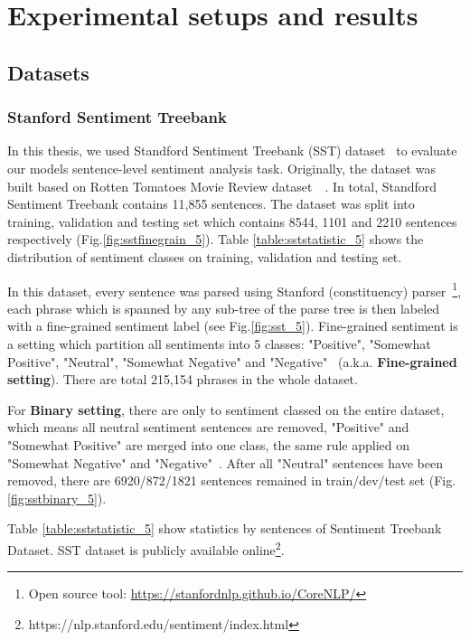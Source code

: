 \hypertarget{chap:result}{\chapter{Experimental setups and results}}\label{result-discuss}
\section{Datasets}
\subsection{Stanford Sentiment Treebank}
In this thesis, we used Standford Sentiment Treebank (SST) dataset~\cite{socher2013recursive} to evaluate our models sentence-level sentiment analysis task.
Originally, the dataset was built based on Rotten Tomatoes Movie Review dataset~\cite{Rotten-Tomato}~\cite{socher2013recursive}.
In total, Standford Sentiment Treebank contains 11,855 sentences.
The dataset was split into training, validation and testing set which contains 8544, 1101 and 2210 sentences respectively (Fig.\ref{fig:sstfinegrain_5}).
Table \ref{table:sststatistic_5} shows the distribution of sentiment classes on training, validation and testing set.

In this dataset, every sentence was parsed using Stanford (constituency) parser~\cite{socher2013recursive}\footnote{Open source tool: \url{https://stanfordnlp.github.io/CoreNLP/}}, each phrase which is spanned by any sub-tree of the parse tree is then labeled with  a fine-grained sentiment label (see Fig.\ref{fig:sst_5}).
Fine-grained sentiment is a setting which partition all sentiments into 5 classes: "Positive", "Somewhat Positive", "Neutral", "Somewhat Negative" and "Negative"~\cite{socher2013recursive} (a.k.a. \textbf{Fine-grained setting}).
There are total 215,154 phrases in the whole dataset.

For \textbf{Binary setting}, there are only to sentiment classed on the entire dataset, which means all neutral sentiment sentences are removed, "Positive" and "Somewhat Positive" are merged into one class, the same rule applied on "Somewhat Negative" and "Negative"~\cite{socher2013recursive}.
After all "Neutral" sentences have been removed, there are 6920/872/1821 sentences remained in train/dev/test set (Fig.\ref{fig:sstbinary_5}).


Table \ref{table:sststatistic_5} show statistics by sentences of Sentiment Treebank Dataset.
SST dataset is publicly available online\footnote{https://nlp.stanford.edu/sentiment/index.html}.

